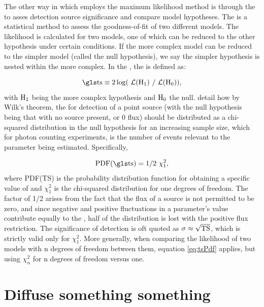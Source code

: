 The other way in which \Fermi{} employs the maximum likelihood method is through the \lrt{} to asses detection source significance and compare model hypotheses. The \lrt{} is a statistical method to assess the goodness-of-fit of two different models. The likelihood is calculated for two models, one of which can be reduced to the other hypothesis under certain conditions. If the more complex model can be reduced to the simpler model (called the null hypothesis), we say the simpler hypothesis is nested within the more complex. In the \lrt{}, the \ts{} is defined as: 

\begin{equation}\label{eq:LRT}
\rm \ts{} \equiv 2\log(\like{}(H_1)~/ \like{}(H_0)),
\end{equation}
with ${\rm H_1}$ being the more complex hypothesis and ${\rm H_0}$ the null. \cite{mattox96} detail how by Wilk's theorem, the \ts{} for detection of a point source (with the null hypothesis being that with no source present, or 0 flux) should be distributed as a chi-squared  distribution in the null hypothesis for an increasing sample size, which for photon counting experiments, is the number of events relevant to the parameter being estimated. Specifically, 

\begin{equation}\label{eq:tsPdf}
\rm PDF(\ts{}) = 1/2~\chi^2_1,
\end{equation} 
where PDF(TS) is the probability distribution function for obtaining a specific value of \ts{} and $\chi^2_1$ is the chi-squared  distribution for one degrees of freedom. The factor of 1/2 arises from the fact that the flux of a source is not permitted to be zero, and since negative and positive fluctuations in a parameter's value contribute equally to the \ts{}, half of the distribution is lost with the positive flux restriction. The significance of detection is oft quoted as ${\rm \sigma \approx \sqrt{TS}}$, which is strictly valid only for $\chi^2_1$. More generally, when comparing the likelihood of two models with n degrees of freedom between them, equation \ref{eq:tsPdf} applies, but using  $\chi^2_n$ for n degrees of freedom versus one.


\section{\label{FGST:diffuse}Diffuse something something}

